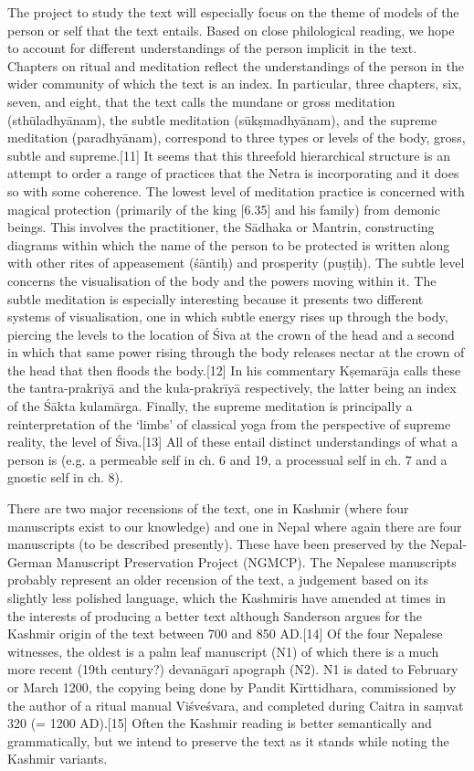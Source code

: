 {The project to study the text will especially focus on the theme of models of the person or self that the text entails. Based on close philological reading, we hope to account for different understandings of the person implicit in the text. Chapters on ritual and meditation reflect the understandings of the person in the wider community of which the text is an index. In particular, three chapters, six, seven, and eight, that the text calls the mundane or gross meditation (sthūladhyānam), the subtle meditation (sūkṣmadhyānam), and the supreme meditation (para­dhyānam), correspond to three types or levels of the body, gross, subtle and supreme.[11] It seems that this threefold hierarchical structure is an attempt to order a range of practices that the Netra is incorporating and it does so with some coherence. The lowest level of meditation practice is concerned with magical protection (primarily of the king [6.35] and his family) from demonic beings. This involves the practitioner, the Sādhaka or Mantrin, constructing diagrams within which the name of the person to be protected is written along with other rites of appeasement (śāntiḥ) and prosperity (puṣṭiḥ). The subtle level concerns the visualisation of the body and the powers moving within it. The subtle meditation is especially interesting because it presents two different systems of visualisation, one in which subtle energy rises up through the body, piercing the levels to the location of Śiva at the crown of the head and a second in which that same power rising through the body releases nectar at the crown of the head that then floods the body.[12] In his commentary Kṣemarāja calls these the tantra-prakrīyā and the kula-prakrīyā respectively, the latter being an index of the Śākta kulamārga. Finally, the supreme meditation is principally a reinterpretation of the ‘limbs’ of classical yoga from the perspective of supreme reality, the level of Śiva.[13] All of these entail distinct understandings of what a person is (e.g. a permeable self in ch. 6 and 19, a processual self in ch. 7 and a gnostic self in ch. 8).

There are two major recensions of the text, one in Kashmir (where four manuscripts exist to our knowledge) and one in Nepal where again there are four manuscripts (to be described presently). These have been preserved by the Nepal-German Manuscript Preservation Project (NGMCP). The Nepalese manuscripts probably represent an older recension of the text, a judgement based on its slightly less polished language, which the Kashmiris have amended at times in the interests of producing a better text although Sanderson argues for the Kashmir origin of the text between 700 and 850 AD.[14] Of the four Nepalese witnesses, the oldest is a palm leaf manuscript (N1) of which there is a much more recent (19th century?) devanāgarī apograph (N2). N1 is dated to February or March 1200, the copying being done by Pandit Kīrttidhara, commissioned by the author of a ritual manual Viśveśvara, and completed during Caitra in saṃvat 320 (= 1200 AD).[15] Often the Kashmir reading is better semantically and grammatically, but we intend to preserve the text as it stands while noting the Kashmir variants.

}
